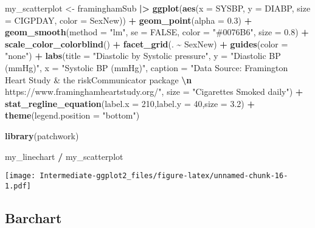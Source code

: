 \documentclass[
]{article}
\newenvironment{Shaded}{\begin{snugshade}}{\end{snugshade}}
\newcommand{\AttributeTok}[1]{\textcolor[rgb]{0.13,0.29,0.53}{#1}}
\newcommand{\ConstantTok}[1]{\textcolor[rgb]{0.56,0.35,0.01}{#1}}
\newcommand{\DecValTok}[1]{\textcolor[rgb]{0.00,0.00,0.81}{#1}}
\newcommand{\FloatTok}[1]{\textcolor[rgb]{0.00,0.00,0.81}{#1}}
\newcommand{\FunctionTok}[1]{\textcolor[rgb]{0.13,0.29,0.53}{\textbf{#1}}}
\newcommand{\NormalTok}[1]{#1}
\newcommand{\OtherTok}[1]{\textcolor[rgb]{0.56,0.35,0.01}{#1}}
\newcommand{\SpecialCharTok}[1]{\textcolor[rgb]{0.81,0.36,0.00}{\textbf{#1}}}
\newcommand{\StringTok}[1]{\textcolor[rgb]{0.31,0.60,0.02}{#1}}
\begin{document}
\begin{Shaded}
\begin{Highlighting}[]
\NormalTok{my\_scatterplot }\OtherTok{\textless{}{-}}\NormalTok{ framinghamSub }\SpecialCharTok{|\textgreater{}}
  \FunctionTok{ggplot}\NormalTok{(}\FunctionTok{aes}\NormalTok{(}\AttributeTok{x =}\NormalTok{ SYSBP, }\AttributeTok{y =}\NormalTok{ DIABP,}
             \AttributeTok{size =}\NormalTok{ CIGPDAY,}
             \AttributeTok{color =}\NormalTok{ SexNew)) }\SpecialCharTok{+}
  \FunctionTok{geom\_point}\NormalTok{(}\AttributeTok{alpha =} \FloatTok{0.3}\NormalTok{) }\SpecialCharTok{+}
  \FunctionTok{geom\_smooth}\NormalTok{(}\AttributeTok{method =} \StringTok{"lm"}\NormalTok{, }\AttributeTok{se =} \ConstantTok{FALSE}\NormalTok{,}
              \AttributeTok{color =} \StringTok{"\#0076B6"}\NormalTok{, }\AttributeTok{size =} \FloatTok{0.8}\NormalTok{) }\SpecialCharTok{+}
  \FunctionTok{scale\_color\_colorblind}\NormalTok{() }\SpecialCharTok{+}
  \FunctionTok{facet\_grid}\NormalTok{(. }\SpecialCharTok{\textasciitilde{}}\NormalTok{ SexNew) }\SpecialCharTok{+}
  \FunctionTok{guides}\NormalTok{(}\AttributeTok{color =} \StringTok{"none"}\NormalTok{) }\SpecialCharTok{+}
  \FunctionTok{labs}\NormalTok{(}\AttributeTok{title =} \StringTok{"Diastolic by Systolic pressure"}\NormalTok{,}
       \AttributeTok{y =} \StringTok{"Diastolic BP (mmHg)"}\NormalTok{,}
       \AttributeTok{x =} \StringTok{"Systolic BP (mmHg)"}\NormalTok{,}
       \AttributeTok{caption =} \StringTok{"Data Source: Framington Heart Study \& the riskCommunicator package }\SpecialCharTok{\textbackslash{}n}\StringTok{ https://www.framinghamheartstudy.org/"}\NormalTok{,}
       \AttributeTok{size =} \StringTok{"Cigarettes Smoked daily"}\NormalTok{) }\SpecialCharTok{+}
  \FunctionTok{stat\_regline\_equation}\NormalTok{(}\AttributeTok{label.x =} \DecValTok{210}\NormalTok{,}\AttributeTok{label.y =} \DecValTok{40}\NormalTok{,}\AttributeTok{size =} \FloatTok{3.2}\NormalTok{) }\SpecialCharTok{+}
  \FunctionTok{theme}\NormalTok{(}\AttributeTok{legend.position =} \StringTok{"bottom"}\NormalTok{)}

\FunctionTok{library}\NormalTok{(patchwork)}

\NormalTok{my\_linechart }\SpecialCharTok{/}\NormalTok{ my\_scatterplot}
\end{Highlighting}
\end{Shaded}

\texttt{[image: Intermediate-ggplot2\_files/figure-latex/unnamed-chunk-16-1.pdf]}

\hypertarget{barchart}{%
\subsection{Barchart}\label{barchart}}
\end{document}
